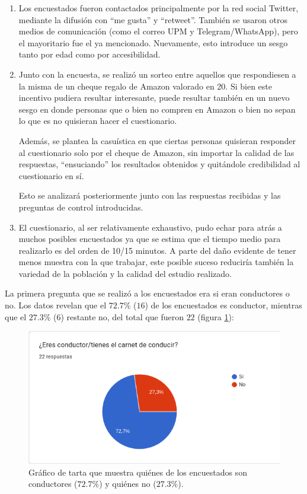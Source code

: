 \begin{enumerate}
  \item Los encuestados fueron contactados principalmente por la red social Twitter,
        mediante la difusión con ``me gusta'' y ``retweet''. También se usaron otros
        medios de comunicación (como el correo UPM y Telegram/WhatsApp), pero el
        mayoritario fue el ya mencionado. Nuevamente, esto introduce un sesgo tanto
        por edad como por accesibilidad.

  \item Junto con la encuesta, se realizó un sorteo entre aquellos que respondiesen
        a la misma de un cheque regalo de Amazon valorado en 20\EUR{}. Si bien este
        incentivo pudiera resultar interesante, puede resultar también en un nuevo
        sesgo en donde personas que o bien no compren en Amazon o bien no sepan
        lo que es no quisieran hacer el cuestionario.

        Además, se plantea la casuística en que ciertas personas quisieran responder
        al cuestionario solo por el cheque de Amazon, sin importar la calidad de
        las respuestas, ``ensuciando'' los resultados obtenidos y quitándole credibilidad
        al cuestionario en sí.

        Esto se analizará posteriormente junto con las respuestas recibidas y las
        preguntas de control introducidas.

  \item El cuestionario, al ser relativamente exhaustivo, pudo echar para atrás a muchos
        posibles encuestados ya que se estima que el tiempo medio para realizarlo es del
        orden de 10/15 minutos. A parte del daño evidente de tener menos muestra con la
        que trabajar, este posible suceso reduciría también la variedad de la población
        y la calidad del estudio realizado.
\end{enumerate}

La primera pregunta que se realizó a los encuestados era si eran conductores o no.
Los datos revelan que el $72.7\%$ ($16$) de los encuestados es conductor, mientras que el
$27.3\%$ ($6$) restante no, del total que fueron $22$ (figura \ref{fig:drivers-nodrivers}):

\begin{figure}[H]
  \centering
  \includegraphics[width=\linewidth]{images/drivers-nodrivers.png}
  \caption{Gráfico de tarta que muestra quiénes de los encuestados son conductores ($72.7\%$) y quiénes no ($27.3\%$).}
  \label{fig:drivers-nodrivers}
\end{figure}

